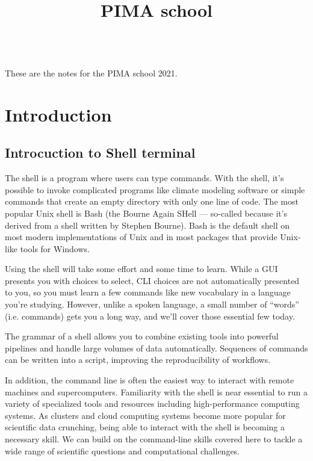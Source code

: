 \documentclass[11pt]{book}
\begin{document}
\title{PIMA school}

\maketitle

\frontmatter
\tableofcontents
\mainmatter

~\\
These are the notes for the PIMA school 2021.



\chapter{Introduction}

\section{Introcuction to Shell terminal}
The shell is a program where users can type commands. With the shell, it’s possible to invoke complicated programs like climate modeling software or simple commands that create an empty directory with only one line of code. The most popular Unix shell is Bash (the Bourne Again SHell — so-called because it’s derived from a shell written by Stephen Bourne). Bash is the default shell on most modern implementations of Unix and in most packages that provide Unix-like tools for Windows.

Using the shell will take some effort and some time to learn. While a GUI presents you with choices to select, CLI choices are not automatically presented to you, so you must learn a few commands like new vocabulary in a language you’re studying. However, unlike a spoken language, a small number of “words” (i.e. commands) gets you a long way, and we’ll cover those essential few today.

The grammar of a shell allows you to combine existing tools into powerful pipelines and handle large volumes of data automatically. Sequences of commands can be written into a script, improving the reproducibility of workflows.

In addition, the command line is often the easiest way to interact with remote machines and supercomputers. Familiarity with the shell is near essential to run a variety of specialized tools and resources including high-performance computing systems. As clusters and cloud computing systems become more popular for scientific data crunching, being able to interact with the shell is becoming a necessary skill. We can build on the command-line skills covered here to tackle a wide range of scientific questions and computational challenges.
\end{document}
